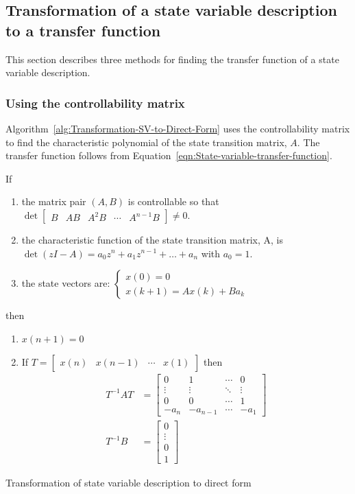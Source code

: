 \documentclass[a4paper,twoside,10pt,english]{report}
\begin{document}
\subsection{\label{sub:Transformation-state-variable-to-transfer-function}Transformation of a state variable description to a transfer function}
This section describes three methods for finding the transfer function of a
state variable description.
\subsubsection{Using the controllability matrix}
Algorithm~\ref{alg:Transformation-SV-to-Direct-Form} uses the controllability
matrix to find the characteristic polynomial of the state transition matrix, 
$A$. The transfer function follows from 
Equation~\ref{eqn:State-variable-transfer-function}.

\begin{algorithm}[!tbph]
If
\begin{enumerate}
\item the matrix pair $\left(A,B\right)$ is controllable so that $\det\left[\begin{array}{ccccc}
B & AB & A^{2}B & \cdots & A^{n-1}B\end{array}\right]\neq0$.
\item the characteristic function of the state transition matrix, A,
  is $\det\left(zI-A\right)=a_{0}z^{n}+a_{1}z^{n-1}+\ldots+a_{n}$ with $a_{0}=1$.
\item the state vectors are: $\begin{cases}
x\left(0\right)=0\\
x\left(k+1\right)=Ax\left(k\right)+Ba_{k}
\end{cases}$
\end{enumerate}
then
\begin{enumerate}
\item $x\left(n+1\right)=0$
\item If $T=\left[\begin{array}{cccc}
x\left(n\right) & x\left(n-1\right) & \cdots & x\left(1\right)\end{array}\right]$
then
\begin{align*}
T^{-1}AT &= \left[\begin{array}{cccc}
0 & 1 & \cdots & 0\\
\vdots & \vdots & \ddots & \vdots\\
0 & 0 & \cdots & 1\\
-a_{n} & -a_{n-1} & \cdots & -a_{1}
\end{array}\right]\\
T^{-1}B &= \left[\begin{array}{c}
0\\
\vdots\\
0\\
1
\end{array}\right]
\end{align*}
\end{enumerate}
\caption{Transformation of state variable description to direct form}
\label{alg:Transformation-SV-to-Direct-Form}
\end{algorithm}
\end{document}
